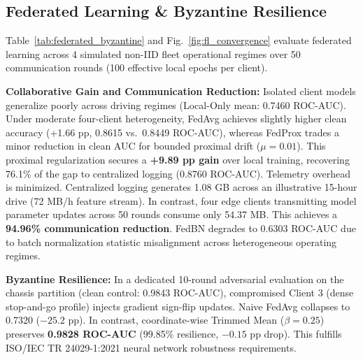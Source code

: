 \documentclass[conference]{IEEEtran}
\begin{document}
\subsection{Federated Learning \& Byzantine Resilience}
Table~\ref{tab:federated_byzantine} and Fig.~\ref{fig:fl_convergence} evaluate federated learning across 4 simulated non-IID fleet operational regimes over 50 communication rounds (100 effective local epochs per client).

\textbf{Collaborative Gain and Communication Reduction:} Isolated client models generalize poorly across driving regimes (Local-Only mean: 0.7460 ROC-AUC). Under moderate four-client heterogeneity, FedAvg achieves slightly higher clean accuracy (+1.66 pp, 0.8615 vs.\ 0.8449 ROC-AUC), whereas FedProx trades a minor reduction in clean AUC for bounded proximal drift ($\mu=0.01$). This proximal regularization secures a \textbf{+9.89 pp gain} over local training, recovering 76.1\% of the gap to centralized logging (0.8760 ROC-AUC). Telemetry overhead is minimized. Centralized logging generates 1.08 GB across an illustrative 15-hour drive (72 MB/h feature stream). In contrast, four edge clients transmitting model parameter updates across 50 rounds consume only 54.37 MB. This achieves a \textbf{94.96\% communication reduction}. FedBN degrades to 0.6303 ROC-AUC due to batch normalization statistic misalignment across heterogeneous operating regimes.

\textbf{Byzantine Resilience:} In a dedicated 10-round adversarial evaluation on the chassis partition (clean control: 0.9843 ROC-AUC), compromised Client 3 (dense stop-and-go profile) injects gradient sign-flip updates. Naive FedAvg collapses to 0.7320 ($-25.2$ pp). In contrast, coordinate-wise Trimmed Mean ($\beta=0.25$) \cite{yin2018byzantine} preserves \textbf{0.9828 ROC-AUC} (99.85\% resilience, $-0.15$ pp drop). This fulfills ISO/IEC TR 24029-1:2021 neural network robustness requirements.
\end{document}
